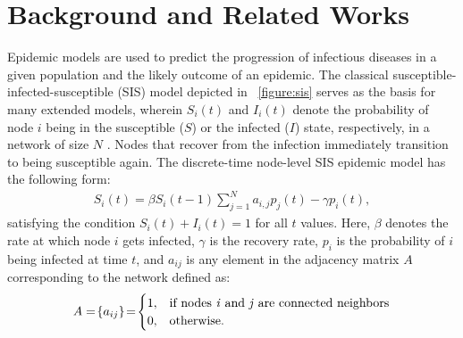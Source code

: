\section{Background and Related Works}
\label{sec:related}
Epidemic models are used to predict the progression of infectious diseases in a given population and the likely outcome of an epidemic. 
The classical susceptible-infected-susceptible (SIS) model depicted in \figurename{~\ref{figure:sis}} serves as the basis for many extended models, wherein $S_i(t)$ and $I_i(t)$ denote the probability of node $i$ being in the susceptible ($S$) or the infected ($I$) state, respectively, in a network of size $N$ \cite{Vynnycky2010}. Nodes that recover from the infection immediately transition to being susceptible again. The discrete-time node-level SIS epidemic model has the following form:
\begin{align}
	S_i(t) = \beta S_i(t-1) \sum_{j=1}^N a_{i,j} p_j(t) - \gamma p_i(t),
\end{align} 
satisfying the condition $S_i(t) + I_i(t) = 1$ for all $t$ values. Here, $\beta$ denotes the rate at which node $i$ gets infected, $\gamma$ is the recovery rate, $p_i$ is the probability of $i$ being infected at time $t$, and $a_{ij}$ is any element in the adjacency matrix $A$ corresponding to the network defined as:
\begin{align}
    A =\! \{a_{ij}\} \!=\! 
\begin{cases}
    1,   & \text{if } \text{nodes \emph{i} and \emph{j} are connected neighbors}\\
    0,   & \text{otherwise}.
\end{cases}
\end{align}

